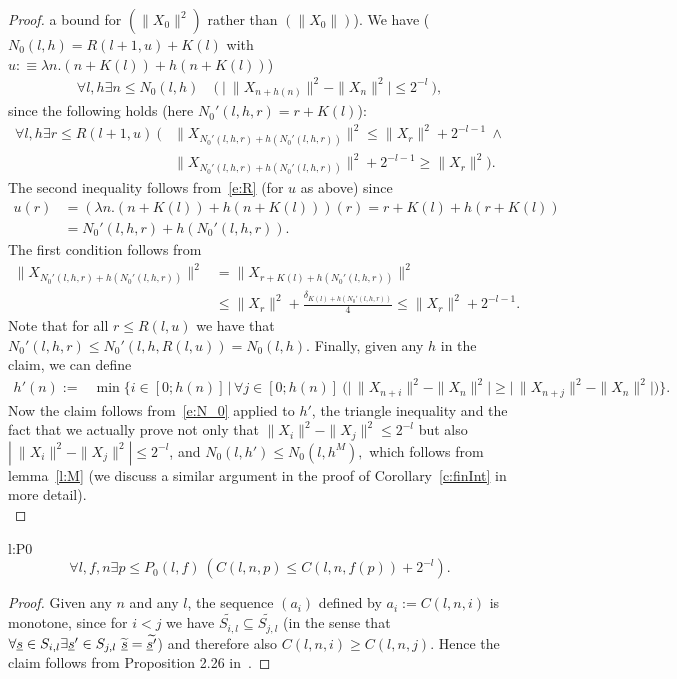 \begin{proof}
a bound for $(\|X_0\|^2)$ rather than $(\|X_0\|)$).
We have ($N_0(l,h)=R(l+1,u)+K(l)$ with $ u:\equiv\lambda n . (n + K(l))+h(n + K(l))$)
\begin{align*}
\forall l,h \exists n\leq N_0(l,h) \quad  \Big(\ \big|\ \|X_{n+h(n)}\|^2 - \|X_{n}\|^2\big| \leq 2^{-l}\ \Big),  \tag{N0}\label{e:N_0} 
\end{align*}
since the following holds (here $N_0'(l,h,r) = r+K(l)$):
\begin{align*}
\forall l,h \exists r\leq R(l+1,u)\ \big(
		  & \|X_{N_0'(l,h,r)+h(N_0'(l,h,r))}\|^2\leq \|X_{r}\|^2 + 2^{-l-1}\ \wedge\\
		  & \|X_{N_0'(l,h,r)+h(N_0'(l,h,r))}\|^2 + 2^{-l-1}\geq \|X_{r}\|^2 \big).
\end{align*}
The second inequality follows from~\eqref{e:R} (for $u$ as above) since
\begin{align*}
u(r)&=(\lambda n . (n + K(l))+h(n + K(l))) (r) = r + K(l) + h(r + K(l)) \\
&=N_0'(l,h,r)+h(N_0'(l,h,r)).
\end{align*}
The first condition follows from
\begin{align*}
\|X_{N_0'(l,h,r)+h(N_0'(l,h,r))}\|^2&=\|X_{r+K(l)+h(N_0'(l,h,r))}\|^2\\
&\leq\|X_{r}\|^2+\frac{\delta_{K(l)+h(N_0'(l,h,r))}}{4}\leq\|X_{r}\|^2 + 2^{-l-1}.
\end{align*}
Note that for all $r\leq R(l,u)$ we have that $N_0'(l,h,r)\leq N_0'(l,h,R(l,u)) = N_0(l,h)$.
Finally, given any $h$ in the claim, we can define 
\begin{align*}
h'(n):=&\min\Big\{ i\in [0;h(n)]\, \Big|\, 
 \forall j\in[0;h(n)]\ \Big(\big|\, \|X_{n+i}\|^2 - \|X_n\|^2 \big| \geq \big|\, \|X_{n+j}\|^2- \|X_n\|^2 \big|\Big) \Big\}.
\end{align*}
Now the claim follows from~\eqref{e:N_0} applied to $h'$, the triangle inequality and the fact
that we actually prove not only that  
$\|X_{i}\|^2 - \|X_j\|^2\leq 2^{-l}$ 
but also
$|\ \|X_{i}\|^2 - \|X_j\|^2 |\leq 2^{-l}$, and 
$
N_0(l,h')\leq N_0(l,h^M),
$
which follows from lemma~\ref{l:M} (we discuss a similar argument in the proof of Corollary~\ref{c:finInt} in more detail). \\
\end{proof}

\begin{lemma*}[$P_0$ is correct]{l:P0}
\[
\forall l,f,n\exists p\leq P_0(l,f)\ ( C(l,n,p)\leq C(l,n,f(p)) + 2^{-l} ).
\]
\end{lemma*}
\begin{proof}
Given any $n$ and any $l$, the sequence $(a_i)$ defined by
$
a_i:=C(l,n,i)
$
is monotone, since for $i<j$ we have 
$\widetilde{S_{i,l}} \subseteq \widetilde{S_{j,l}}$ (in the sense that$\forall \underline s \in S_{i,l}\exists \underline s'\in S_{j,l}\ \widetilde{\underline s}=\widetilde{\underline s'}$) 
and therefore also $C(l,n,i)\geq C(l,n,j)$. Hence the claim follows from Proposition 2.26 in~\cite{Kohlenbach08}.
\end{proof}

